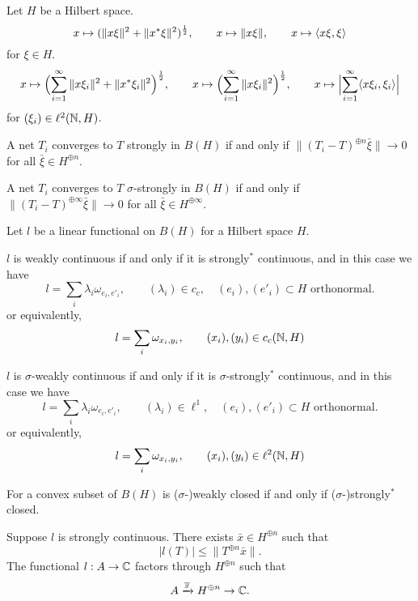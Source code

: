 \documentclass{../../large}
\begin{document}
\begin{prb}
Let $H$ be a Hilbert space.
\[x\mapsto(\|x\xi\|^2+\|x^*\xi\|^2)^{\frac12},\qquad
x\mapsto\|x\xi\|,\qquad
x\mapsto\langle x\xi,\xi\rangle\]
for $\xi\in H$.
\[x\mapsto\Bigl(\sum_{i=1}^\infty\|x\xi_i\|^2+\|x^*\xi_i\|^2\Bigr)^{\frac12},\qquad
x\mapsto\Bigl(\sum_{i=1}^\infty\|x\xi_i\|^2\Bigr)^{\frac12},\qquad
x\mapsto\Bigl|\sum_{i=1}^\infty\langle x\xi_i,\xi_i\rangle\Bigr|\]
for $(\xi_i)\in\ell^2(\mathbb{N},H)$.

\begin{parts}
\item
A net $T_i$ converges to $T$ strongly in $B(H)$ if and only if $\|(T_i-T)^{\oplus n}\bar\xi\|\to0$ for all $\bar\xi\in H^{\oplus n}$.
\item
A net $T_i$ converges to $T$ $\sigma$-strongly in $B(H)$ if and only if $\|(T_i-T)^{\oplus\infty}\bar\xi\|\to0$ for all $\bar\xi\in H^{\oplus\infty}$.
\end{parts}
\end{prb}


\begin{prb}
Let $l$ be a linear functional on $B(H)$ for a Hilbert space $H$.
\begin{parts}
\item
$l$ is weakly continuous if and only if it is strongly$^*$ continuous, and in this case we have
\[l=\sum_i\lambda_i\omega_{e_i,e'_i},\qquad(\lambda_i)\in c_c,\quad(e_i),(e'_i)\subset H\text{ orthonormal}.\]
or equivalently,
\[l=\sum_i\omega_{x_i,y_i},\qquad(x_i),(y_i)\in c_c(\mathbb{N},H)\]
\item
$l$ is $\sigma$-weakly continuous if and only if it is $\sigma$-strongly$^*$ continuous, and in this case we have 
\[l=\sum_i\lambda_i\omega_{e_i,e'_i},\qquad(\lambda_i)\in\ell^1,\quad(e_i),(e'_i)\subset H\text{ orthonormal}.\]
or equivalently,
\[l=\sum_i\omega_{x_i,y_i},\qquad(x_i),(y_i)\in\ell^2(\mathbb{N},H)\]
\item For a convex subset of $B(H)$ is ($\sigma$-)weakly closed if and only if ($\sigma$-)strongly$^*$ closed.
\end{parts}
\end{prb}
\begin{pf}
Suppose $l$ is strongly continuous.
There exists $\bar x\in H^{\oplus n}$ such that
\[|l(T)|\le\|T^{\oplus n}\bar x\|.\]
The functional $l:A\to\mathbb{C}$ factors through $H^{\oplus n}$ such that
\[A\xrightarrow{\overline x}H^{\oplus n}\to\mathbb{C}.\]
\end{pf}
\end{document}
